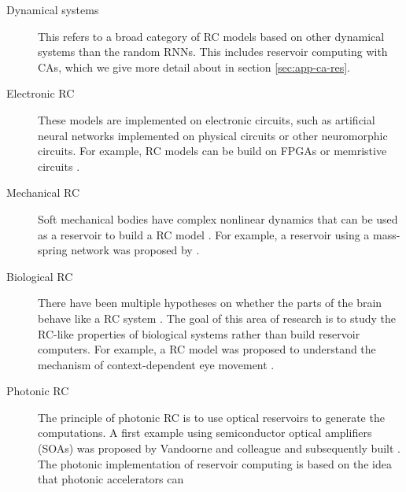 \begin{description}
  \item[Dynamical systems] This refers to a broad category of \ac{RC} models
        based on other dynamical systems than the random \acp{RNN}. This
        includes reservoir computing with \aclp{CA}, which we give more detail
        about in section \ref{sec:app-ca-res}.
  \item[Electronic \ac{RC}] These models are implemented on electronic circuits,
        such as artificial neural networks implemented on physical circuits or
        other neuromorphic circuits. For example, \ac{RC} models can be build on
        FPGAs \parencite{antonikApplicationFPGAReal2018,
        verstraetenReservoirComputingStochastic2005,
        alomarLowcostHardwareImplementation2014,
        antonikFPGAImplementationReservoir2015} or memristive circuits
        \parencite{yangInvestigationsStaircaseMemristor2016,
        merkelMemristiveReservoirComputing2014,
        donahueDesignAnalysisNeuromemristive2015}.
  \item[Mechanical \ac{RC}] Soft mechanical bodies have complex nonlinear
        dynamics that can be used as a reservoir to build a \ac{RC} model
        \parencite{pfeiferHowBodyShapes2007}. For example, a reservoir using a
        mass-spring network was proposed by
        \textcite{hauserTheoreticalFoundationMorphological2011}.
  \item[Biological \ac{RC}] There have been multiple hypotheses on whether the
        parts of the brain behave like a \ac{RC} system
        \parencite{yamazakiCerebellumLiquidState2007}. The goal of this area of
        research is to study the \ac{RC}-like properties of
        biological systems rather than build reservoir computers. For example, a
        \ac{RC} model was proposed to understand the mechanism of
        context-dependent eye movement
        \parencite{domineyComplexSensorymotorSequence1995,
        domineyModelCorticostriatalPlasticity1995}.
  \item[Photonic \ac{RC}] The principle of photonic \ac{RC} is to use optical
        reservoirs to generate the computations. A first example using
        semiconductor optical amplifiers (SOAs) was proposed by
        Vandoorne and colleague \parencite{vandoorneOpticalSignalProcessing2008,
        vandoorneParallelReservoirComputing2011} and subsequently built \parencite{vandoorneExperimentalDemonstrationReservoir2014}.
        The photonic implementation of reservoir computing is based on the idea that
        photonic accelerators \parencite{kitayamaNovelFrontierPhotonics2019} can

\end{description}
